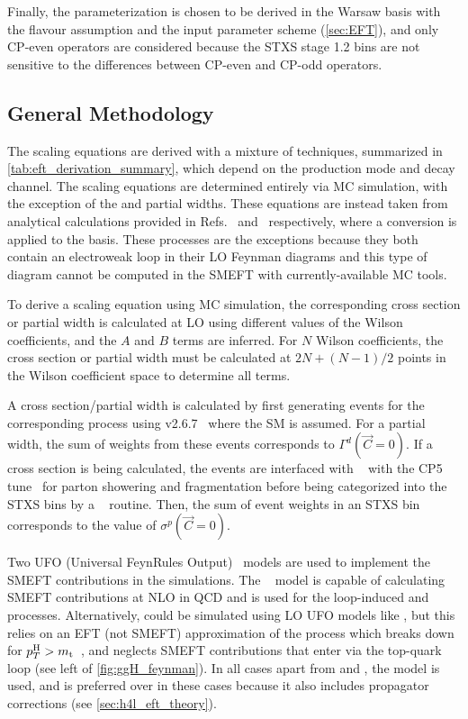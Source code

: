 Finally, the parameterization is chosen to be derived in the Warsaw basis with the \topUtl flavour assumption and the \mWinput input parameter scheme (\cref{sec:EFT}), and only CP-even operators are considered because the STXS stage 1.2 bins are not sensitive to the differences between CP-even and CP-odd operators.

\subsection{General Methodology}\label{sec:eft_methodology_overview}


The scaling equations are derived with a mixture of techniques, summarized in \cref{tab:eft_derivation_summary}, which depend on the production mode and decay channel. The scaling equations are determined entirely via MC simulation, with the exception of the \Hgg and \HZg partial widths. These equations are instead taken from analytical calculations provided in Refs.~\cite{Dawson:2018liq} and~\cite{Dawson:2018pyl} respectively, where a conversion is applied to the \topUtl basis. These processes are the exceptions because they both contain an electroweak loop in their LO Feynman diagrams and this type of diagram cannot be computed in the SMEFT with currently-available MC tools.

To derive a scaling equation using MC simulation, the corresponding cross section or partial width is calculated at LO using different values of the Wilson coefficients, and the $A$ and $B$ terms are inferred. For $N$ Wilson coefficients, the cross section or partial width must be calculated at $2N + (N-1)/2$ points in the Wilson coefficient space to determine all terms. 

A cross section/partial width is calculated by first generating events for the corresponding process using \MADGRAPH v2.6.7~\cite{MadGraph,MadGraphMLM} where the SM is assumed. For a partial width, the sum of weights from these events corresponds to $\Gamma^d(\vec{C}=0)$. If a cross section is being calculated, the events are interfaced with ~\cite{Sjostrand:2014zea} with the CP5 tune~\cite{CMS:2015wcf,CMS:2019csb} for parton showering and fragmentation before being categorized into the STXS bins by a \rivet~\cite{Bierlich:2019rhm} routine. Then, the sum of event weights in an STXS bin corresponds to the value of $\sigma^p(\vec{C}=0)$.

Two UFO (Universal FeynRules Output)~\cite{Degrande:2011ua} models are used to implement the SMEFT contributions in the \MADGRAPH simulations. The \SMEFTatNLO~\cite{Degrande:2020evl} model is capable of calculating SMEFT contributions at NLO in QCD and is used for the loop-induced \ggH and \ggZH processes. Alternatively, \ggH could be simulated using LO UFO models like \SMEFTsim, but this relies on an EFT (not SMEFT) approximation of the process which breaks down for $p_T^\mathrm{H} > m_\mathrm{t}$~\cite{Brivio:2020onw}, and neglects SMEFT contributions that enter via the top-quark loop (see left of \cref{fig:ggH_feynman}). In all cases apart from \ggH and \ggZH, the \SMEFTsim model is used, and is preferred over \SMEFTatNLO in these cases because it also includes propagator corrections (see \cref{sec:h4l_eft_theory}).


